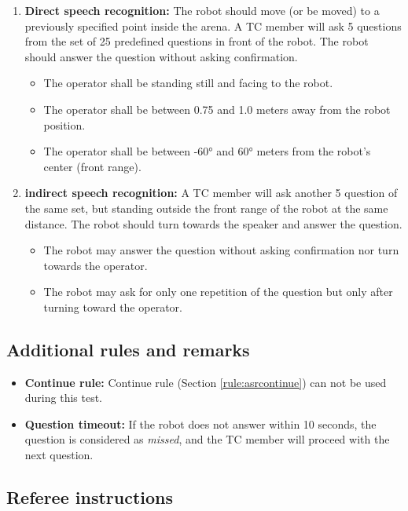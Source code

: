 \begin{enumerate}
\item \textbf{Direct speech recognition: } The robot should move (or be moved) to a previously specified point inside the arena. A TC member will ask 5 questions from the set of 25 predefined questions in front of the robot. The robot should answer the question without asking confirmation.
\begin{itemize}
\item The operator shall be standing still and facing to the robot.
\item The operator shall be between 0.75 and 1.0 meters away from the robot position.
\item The operator shall be between -60° and 60° meters from the robot's center (front range).
\end{itemize}
\item \textbf{indirect speech recognition: } A TC member will ask another 5 question of the same set, but standing outside the front range of the robot at the same distance. The robot should turn towards the speaker and answer the question.
\begin{itemize}
\item The robot may answer the question without asking confirmation nor turn towards the operator.
\item The robot may ask for only one repetition of the question but only after turning toward the operator.
\end{itemize}
\end{enumerate}


\subsection{Additional rules and remarks}

\begin{itemize}
\item \textbf{Continue rule:} Continue rule (Section \ref{rule:asrcontinue}) can not be used during this test.
\item \textbf{Question timeout:} If the robot does not answer within 10 seconds, the question is considered as \textit{missed}, and the TC member will proceed with the next question.
\end{itemize}

\subsection{Referee instructions}

